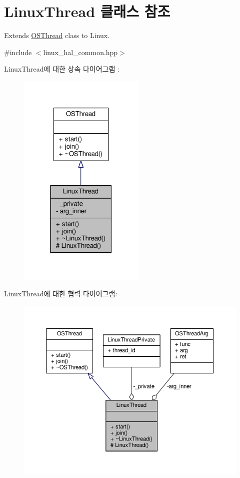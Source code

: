 \hypertarget{class_linux_thread}{}\section{Linux\+Thread 클래스 참조}
\label{class_linux_thread}


Extends \hyperlink{class_o_s_thread}{O\+S\+Thread} class to Linux.  




{\ttfamily \#include $<$linux\+\_\+hal\+\_\+common.\+hpp$>$}



Linux\+Thread에 대한 상속 다이어그램 \+: 
\nopagebreak
\begin{figure}[H]
\begin{center}
\leavevmode
\includegraphics[width=171pt]{class_linux_thread__inherit__graph}
\end{center}
\end{figure}


Linux\+Thread에 대한 협력 다이어그램\+:
\nopagebreak
\begin{figure}[H]
\begin{center}
\leavevmode
\includegraphics[width=350pt]{class_linux_thread__coll__graph}
\end{center}
\end{figure}
